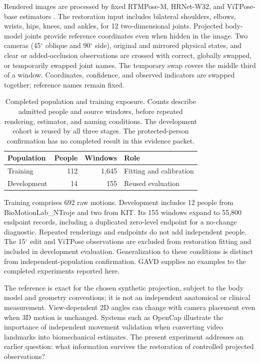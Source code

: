\documentclass{article}
\newcommand{\degunit}{^{\circ}}
\begin{document}
Rendered images are processed by fixed RTMPose-M, HRNet-W32, and ViTPose-base estimators \citep{jiang2023rtmpose,sun2019hrnet,xu2022vitpose}. The restoration input includes bilateral shoulders, elbows, wrists, hips, knees, and ankles, for 12 two-dimensional joints. Projected body-model joints provide reference coordinates even when hidden in the image. Two cameras (45$\degunit$ oblique and 90$\degunit$ side), original and mirrored physical states, and clear or added-occlusion observations are crossed with correct, globally swapped, or temporarily swapped joint names. The temporary swap covers the middle third of a window. Coordinates, confidence, and observed indicators are swapped together; reference names remain fixed.

\begin{table}[h]\centering
\caption{Completed population and training exposure. Counts describe admitted people and source windows, before repeated rendering, estimator, and naming conditions. The development cohort is reused by all three stages. The protected-person confirmation has no completed result in this evidence packet.}
\label{tab:data}
\begin{tabular}{lrrl}\toprule
Population & People & Windows & Role \\\midrule
Training &112&1,645& Fitting and calibration\\
Development &14&155& Reused evaluation\\\bottomrule
\end{tabular}
\end{table}

Training comprises 692 raw motions. Development includes 12 people from BioMotionLab\_NTroje and two from KIT. Its 155 windows expand to 55,800 endpoint records, including a duplicated zero-level endpoint for a no-change diagnostic. Repeated renderings and endpoints do not add independent people. The 15$\degunit$ edit and ViTPose observations are excluded from restoration fitting and included in development evaluation. Generalization to these conditions is distinct from independent-population confirmation. GAVD supplies no examples to the completed experiments reported here.

The reference is exact for the chosen synthetic projection, subject to the body model and geometry conventions; it is not an independent anatomical or clinical measurement. View-dependent 2D angles can change with camera placement even when 3D motion is unchanged. Systems such as OpenCap \citep{uhlrich2023opencap} illustrate the importance of independent movement validation when converting video landmarks into biomechanical estimates. The present experiment addresses an earlier question: what information survives the restoration of controlled projected observations?
\end{document}
